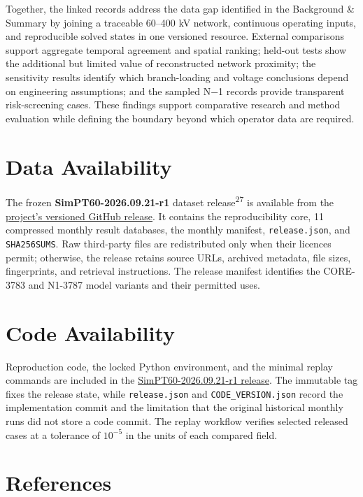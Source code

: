 \documentclass[
  10pt]{article}
\begin{document}
Together, the linked records address the data gap identified in the
Background \& Summary by joining a traceable 60--400 kV network,
continuous operating inputs, and reproducible solved states in one
versioned resource. External comparisons support aggregate temporal
agreement and spatial ranking; held-out tests show the additional but
limited value of reconstructed network proximity; the sensitivity
results identify which branch-loading and voltage conclusions depend on
engineering assumptions; and the sampled N−1 records provide transparent
risk-screening cases. These findings support comparative research and
method evaluation while defining the boundary beyond which operator data
are required.

\section{Data Availability}\label{data-availability}

The frozen \textbf{SimPT60-2026.09.21-r1} dataset
release\textsuperscript{27} is available from the
\href{https://github.com/MingLeiZhou/PortugueseOPD/releases/tag/SimPT60-2026.09.21-r1}{project's
versioned GitHub release}. It contains the reproducibility core, 11
compressed monthly result databases, the monthly manifest,
\texttt{release.json}, and \texttt{SHA256SUMS}. Raw third-party files
are redistributed only when their licences permit; otherwise, the
release retains source URLs, archived metadata, file sizes,
fingerprints, and retrieval instructions. The release manifest
identifies the CORE-3783 and N1-3787 model variants and their permitted
uses.

\section{Code Availability}\label{code-availability}

Reproduction code, the locked Python environment, and the minimal replay
commands are included in the
\href{https://github.com/MingLeiZhou/PortugueseOPD/releases/tag/SimPT60-2026.09.21-r1}{SimPT60-2026.09.21-r1
release}. The immutable tag fixes the release state, while
\texttt{release.json} and \texttt{CODE\_VERSION.json} record the
implementation commit and the limitation that the original historical
monthly runs did not store a code commit. The replay workflow verifies
selected released cases at a tolerance of \(10^{-5}\) in the units of
each compared field.

\section*{References}\label{bibliography}
\end{document}
